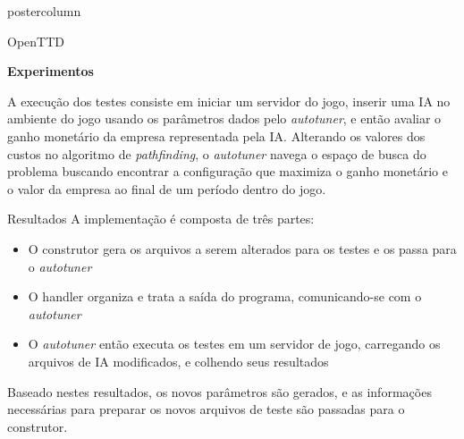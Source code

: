 \documentclass[final]{beamer}
\begin{document}
\begin{frame}
\begin{columns}
\begin{column}{.5\textwidth}
\begin{beamercolorbox}[center,wd=\textwidth]{postercolumn}
\begin{minipage}[T]{.95\textwidth}
{\begin{block}{OpenTTD}
                \vspace*{0,2cm}
                
                \textbf{Experimentos}
                
                \vspace*{0.2cm}
                A execução dos testes consiste em iniciar um servidor do jogo, inserir uma IA no ambiente do jogo usando os parâmetros dados pelo \textit{autotuner}, e então avaliar o ganho monetário da empresa representada pela IA. Alterando os valores dos custos no algoritmo de \textit{pathfinding}, o \textit{autotuner} navega o espaço de busca do problema buscando encontrar a configuração que maximiza o ganho monetário e o valor da empresa ao final de um período dentro do jogo.
                
                \vspace*{0.5cm} 
            \end{block}

            \vspace*{0.2cm} 
            
            \begin{block}{Resultados}
              \justifying 
                A implementação é composta de três partes:
                \begin{itemize}
                	\item O construtor gera os arquivos a serem alterados para os testes e os passa para o \textit{autotuner}
                	\item O handler organiza e trata a saída do programa, comunicando-se com o \textit{autotuner}
                	\item O \textit{autotuner} então executa os testes em um servidor de jogo, carregando os arquivos de IA modificados, e colhendo seus resultados	
                \end{itemize}
                
                \vspace*{0.2cm}
                Baseado nestes resultados, os novos parâmetros são gerados, e as informações necessárias para preparar os novos arquivos de teste são passadas para o construtor.


\end{block}}
\end{minipage}
\end{beamercolorbox}
\end{column}
\end{columns}
\end{frame}
\end{document}
